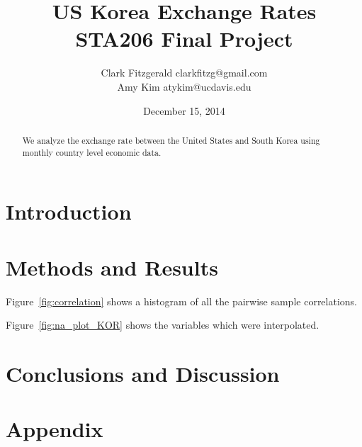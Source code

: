 \documentclass[12pt]{article}
\begin{document}
\title{US Korea Exchange Rates \\ STA206 Final Project}
\date{December 15, 2014}
\author{Clark Fitzgerald clarkfitzg@gmail.com \\ 
        Amy Kim atykim@ucdavis.edu}

\maketitle

\begin{abstract}
    We analyze the exchange rate between the United States and South Korea
    using monthly country level economic data.
\end{abstract}

\section{Introduction}

\section{Methods and Results}

Figure~\ref{fig:correlation} shows a histogram of all the pairwise sample
correlations.

Figure~\ref{fig:na_plot_KOR} shows the variables which were interpolated.

\section{Conclusions and Discussion}


\newpage
\section{Appendix}

\listoffigures
\end{document}
